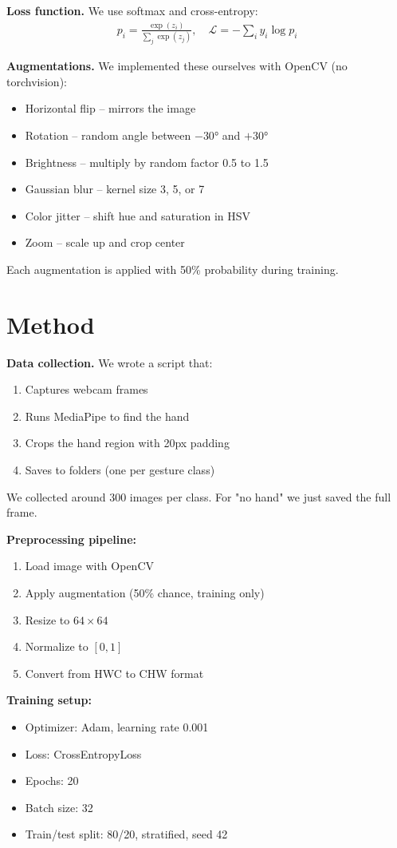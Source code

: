 \documentclass[11pt, a4paper, twocolumn]{article}
\begin{document}
\textbf{Loss function.} We use softmax and cross-entropy:
\begin{align}
    p_i = \frac{\exp(z_i)}{\sum_j \exp(z_j)}, \quad
    \mathcal{L} = -\sum_i y_i \log p_i
\end{align}

\textbf{Augmentations.} We implemented these ourselves with OpenCV (no torchvision):
\begin{itemize}
    \item Horizontal flip -- mirrors the image
    \item Rotation -- random angle between $-30°$ and $+30°$
    \item Brightness -- multiply by random factor 0.5 to 1.5
    \item Gaussian blur -- kernel size 3, 5, or 7
    \item Color jitter -- shift hue and saturation in HSV
    \item Zoom -- scale up and crop center
\end{itemize}
Each augmentation is applied with 50\% probability during training.

\section*{Method}
\textbf{Data collection.} We wrote a script that:
\begin{enumerate}
    \item Captures webcam frames
    \item Runs MediaPipe to find the hand
    \item Crops the hand region with 20px padding
    \item Saves to folders (one per gesture class)
\end{enumerate}
We collected around 300 images per class. For "no hand" we just saved the full frame.

\textbf{Preprocessing pipeline:}
\begin{enumerate}
    \item Load image with OpenCV
    \item Apply augmentation (50\% chance, training only)
    \item Resize to $64 \times 64$
    \item Normalize to $[0, 1]$
    \item Convert from HWC to CHW format
\end{enumerate}

\textbf{Training setup:}
\begin{itemize}
    \item Optimizer: Adam, learning rate 0.001
    \item Loss: CrossEntropyLoss
    \item Epochs: 20
    \item Batch size: 32
    \item Train/test split: 80/20, stratified, seed 42
\end{itemize}
\end{document}
